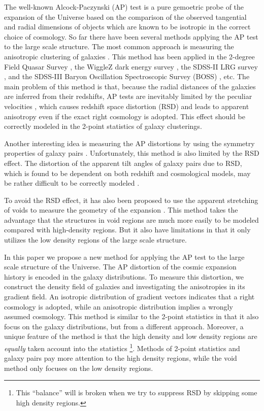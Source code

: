 \documentclass{emulateapj}
\begin{document}
The well-known Alcock-Paczynski (AP) test \citep{AP1979} is a pure gemoetric probe of the expansion of the Universe
based on the comparison of the observed tangential and radial dimensions of objects 
which are known to be isotropic in the correct choice of cosmology.
So far there have been several methods applying the AP test to the large scale structure.
The most common approach is measuring the anisotropic clustering of galaxies
\citep{Ballinger1996,Matsubara1996}.
This method has been applied in the 2-degree Field Quasar Survey \citep{Outram2004},
the WiggleZ dark energy survey \citep{Blake2011},
the SDSS-II LRG survey \citep{ChuangWang2012},
and the SDSS-III Baryon Oscillation Spectroscopic Survey (BOSS)
\citep{Reid2012,Corredoira2013,Anderson2013}, etc.
The main problem of this method is that,
because the radial distances of the galaxies are inferred from their redshifts,
AP tests are inevitably limited by the peculiar velocities \citep{Ballinger1996},
which causes redshift space distortion (RSD) and leads to apparent anisotropy even if the exact right cosmology is adopted.
This effect should be correctly modeled in the 2-point statistics of galaxy clusterings.

Another interesting idea is measuring the AP distortions by using the symmetry properties of galaxy pairs \citep{Marinoni2010}.
Unfortunately, this method is also limited by the RSD effect.
The distortion of the apparent tilt angles of galaxy pairs due to RSD,
which is found to be dependent on both redshift and cosmological models,
may be rather difficult to be correctly modeled \citep{Jennings2011}.

To avoid the RSD effect, it has also been proposed to use the apparent stretching of voids 
to measure the geometry of the expansion \citep{Ryden1995,LavausWandelt1995}.
This method takes the advantage that the structures in void
regions are much more easily to be modeled compared with high-density regions.
But it also have limitations in that it only utilizes the low density regions of the large scale structure.

In this paper we propose a new method for applying the AP test to the large scale structure of the Universe.
The AP distortion of the cosmic expansion history is encoded in the galaxy distributions.
To measure this distortion, we construct the density field of galaxies and investigating the anisotropies in its gradient field.
An isotropic distribution of gradient vectors indicates that a right cosmology is adopted,
while an anisotropic distribution implies a wrongly assumed cosmology.
This method is similar to the 2-point statistics in that it also focus on the galaxy distributions, but from a different approach.
Moreover, a unique feature of the method is that the high density and low density regions are {\it equally} taken account into the statistics
\footnote{This ``balance'' will is broken when we try to suppress RSD by skipping some high density regions.}.
Methods of 2-point statistics and galaxy pairs pay more attention to the high density regions,
while the void method only focuses on the low density regions.
\end{document}
